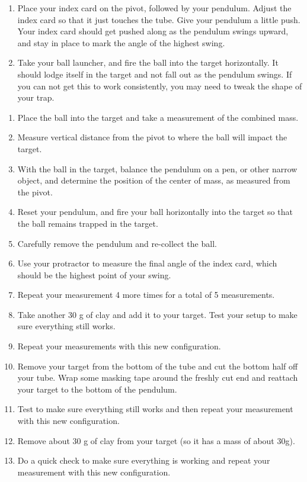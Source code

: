 

\begin{enumerate}
    \item Place your index card on the pivot, followed by your pendulum.  Adjust the index card so that it just touches the tube.  Give your pendulum a little push.  Your index card should get pushed along as the pendulum swings upward, and stay in place to mark the angle of the highest swing.
    \item Take your ball launcher, and fire the ball into the target horizontally.  It should lodge itself in the target and not fall out as the pendulum swings.  If you can not get this to work consistently, you may need to tweak the shape of your trap.
\end{enumerate}
    

\begin{enumerate}
    \item Place the ball into the target and take a measurement of the combined mass.
    \item Measure vertical distance from the pivot to where the ball will impact the target.
    \item With the ball in the target, balance the pendulum on a pen, or other narrow object, and determine the position of the center of mass, as measured from the pivot.
    \item Reset your pendulum, and fire your ball horizontally into the target so that the ball remains trapped in the target.
    \item Carefully remove the pendulum and re-collect the ball.
    \item Use your protractor to measure the final angle of the index card, which should be the highest point of your swing.
    \item Repeat your measurement 4 more times for a total of 5 measurements.
    \item Take another 30 g of clay and add it to your target. Test your setup to make sure everything still works.
    \item Repeat your measurements with this new configuration.
    \item Remove your target from the bottom of the tube and cut the bottom half off your tube.  Wrap some masking tape around the freshly cut end and reattach your target to the bottom of the pendulum.
    \item Test to make sure everything still works and then repeat your measurement with this new configuration.
    \item Remove about 30 g of clay from your target (so it has a mass of about 30g).
    \item Do a quick check to make sure everything is working and repeat your measurement with this new configuration.
\end{enumerate}


